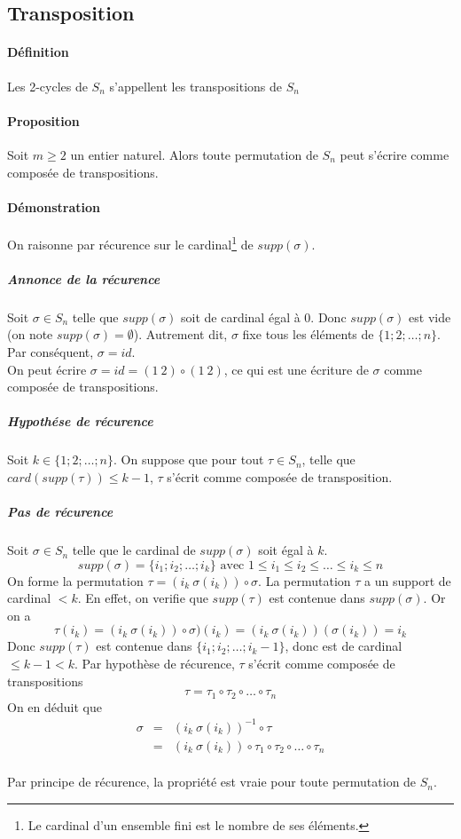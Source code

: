%
\subsection{Transposition}
%
\paragraph{Définition} Les 2-cycles de $S_n$ s'appellent les transpositions de $S_n$

\paragraph{Proposition} Soit $m \geq 2$ un entier naturel. Alors toute permutation de $S_n$ peut s'écrire comme composée de transpositions.

\paragraph{Démonstration}  On raisonne par récurence sur le cardinal\footnote{Le cardinal d'un ensemble fini est le nombre de ses éléments.} de $supp(\sigma)$.
\subparagraph{Annonce de la récurence} Soit $\sigma \in S_n$ telle que $supp(\sigma)$ soit de cardinal égal à $0$. Donc $supp(\sigma)$ est vide (on note $supp(\sigma) = \emptyset$). Autrement dit, $\sigma$ fixe tous les éléments de $\{1; 2; \ldots; n\}$. Par conséquent, $\sigma = id$. \\
On peut écrire $\sigma = id = (1 ~ 2)\circ(1 ~ 2)$, ce qui est une écriture de $\sigma$ comme composée de transpositions.

\subparagraph{Hypothése de récurence} Soit $k \in \{1; 2; \ldots; n\}$. On suppose que pour tout $\tau \in S_n$, telle que $card(supp(\tau)) \leq k-1$, $\tau$ s'écrit comme composée de transposition.

\subparagraph{Pas de récurence} Soit $\sigma \in S_n$ telle que le cardinal de $supp(\sigma)$ soit égal à $k$.
$$supp(\sigma) = \{i_1; i_2; \ldots; i_k\} \text{ avec } 1 \leq i_1 \leq i_2 \leq \ldots \leq i_k \leq n$$
On forme la permutation $\tau = (i_k ~ \sigma(i_k)) \circ \sigma$. La permutation $\tau$ a un support de cardinal $< k$. En effet, on verifie que $supp(\tau)$ est contenue dans $supp(\sigma)$. Or on a
$$\tau(i_k) = (i_k ~ \sigma(i_k)) \circ \sigma) (i_k) = (i_k ~ \sigma(i_k))(\sigma(i_k)) = i_k$$
Donc $supp(\tau)$ est contenue dans $\{i_1; i_2; \ldots; i_k-1\}$, donc est de cardinal $\leq k-1 < k$. Par hypothèse de récurence, $\tau$ s'écrit comme composée de transpositions
$$\tau = \tau_1 \circ \tau_2 \circ \ldots \circ \tau_n$$
On en déduit que 
\begin{eqnarray*}
  \sigma &=& (i_k ~ \sigma(i_k))^{-1} \circ \tau \\
    &=& (i_k ~ \sigma(i_k)) \circ \tau_1 \circ \tau_2 \circ \ldots \circ \tau_n
\end{eqnarray*}
\\
Par principe de récurence, la propriété est vraie pour toute permutation de $S_n$.

